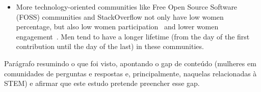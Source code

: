 \begin{itemize}
	\item More technology-oriented communities like Free Open Source Software (FOSS) communities and StackOverflow not only have low women percentage, but also low women participation~\cite{rustad2011suck} and lower women engagement~\cite{Vasilescu27092013}. Men tend to have a longer lifetime (from the day of the first contribution until the day of the last) in these communities.
\end{itemize}

    
    \bigskip
Parágrafo resumindo o que foi visto, apontando o gap de conteúdo (mulheres em comunidades de perguntas e respostas e, principalmente, naquelas relacionadas à STEM) e afirmar que este estudo pretende preencher esse gap.
